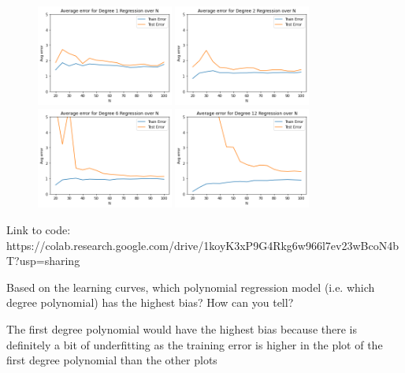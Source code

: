 \begin{solution}
  \begin{figure}[H]
    \centering
    \includegraphics[width=0.4\textwidth]{images/2_1_plot.png}
    \includegraphics[width=0.4\textwidth]{images/2_2_plot.png}
    \includegraphics[width=0.4\textwidth]{images/2_6_plot.png}
    \includegraphics[width=0.4\textwidth]{images/2_12_plot.png}
  \end{figure}
  Link to code: https://colab.research.google.com/drive/1koyK3xP9G4Rkg6w966l7ev23wBcoN4bT?usp=sharing
  \end{solution}

\begin{problem}[3]
  Based on the learning curves, which polynomial regression model (i.e. which degree polynomial) has the highest bias? How can you tell?
\end{problem}
\begin{solution}
  The first degree polynomial would have the highest bias because there is definitely a bit of underfitting as the training error is higher in the plot of the first degree polynomial than the other plots
\end{solution}

